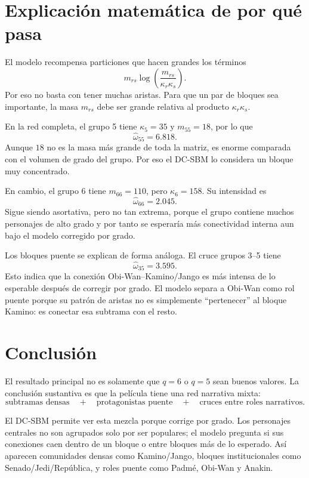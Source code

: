 \documentclass[11pt,letterpaper]{article}
\begin{document}
\section{Explicación matemática de por qué pasa}

El modelo recompensa particiones que hacen grandes los términos
\[
m_{rs}\log\left(\frac{m_{rs}}{\kappa_r\kappa_s}\right).
\]
Por eso no basta con tener muchas aristas. Para que un par de bloques sea importante, la masa $m_{rs}$ debe ser grande relativa al producto $\kappa_r\kappa_s$.

En la red completa, el grupo 5 tiene $\kappa_5=35$ y $m_{55}=18$, por lo que
\[
\hat\omega_{55}=6.818.
\]
Aunque $18$ no es la masa más grande de toda la matriz, es enorme comparada con el volumen de grado del grupo. Por eso el DC-SBM lo considera un bloque muy concentrado.

En cambio, el grupo 6 tiene $m_{66}=110$, pero $\kappa_6=158$. Su intensidad es
\[
\hat\omega_{66}=2.045.
\]
Sigue siendo asortativa, pero no tan extrema, porque el grupo contiene muchos personajes de alto grado y por tanto se esperaría más conectividad interna aun bajo el modelo corregido por grado.

Los bloques puente se explican de forma análoga. El cruce grupos 3--5 tiene
\[
\hat\omega_{35}=3.595.
\]
Esto indica que la conexión Obi-Wan--Kamino/Jango es más intensa de lo esperable después de corregir por grado. El modelo separa a Obi-Wan como rol puente porque su patrón de aristas no es simplemente ``pertenecer'' al bloque Kamino: es conectar esa subtrama con el resto.

\section{Conclusión}

El resultado principal no es solamente que $q=6$ o $q=5$ sean buenos valores. La conclusión sustantiva es que la película tiene una red narrativa mixta:
\[
\boxed{
\text{subtramas densas}
\quad+\quad
\text{protagonistas puente}
\quad+\quad
\text{cruces entre roles narrativos}.
}
\]

El DC-SBM permite ver esta mezcla porque corrige por grado. Los personajes centrales no son agrupados solo por ser populares; el modelo pregunta si sus conexiones caen dentro de un bloque o entre bloques más de lo esperado. Así aparecen comunidades densas como Kamino/Jango, bloques institucionales como Senado/Jedi/República, y roles puente como Padmé, Obi-Wan y Anakin.
\end{document}
